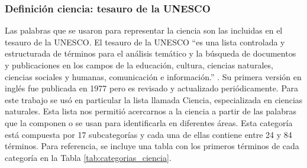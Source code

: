 \documentclass[11pt,a4paper]{article}
\begin{document}
	
	\subsubsection{Definición ciencia: tesauro de la UNESCO}
	Las palabras que se usaron para representar la ciencia son las incluidas en el tesauro de la UNESCO.
	El tesauro de la UNESCO ``es una lista controlada y estructurada de términos para el análisis temático y la búsqueda de documentos y publicaciones en los campos de la educación, cultura, ciencias naturales, ciencias sociales y humanas, comunicación e información.'' \cite{unesco_thesaurus_1977}. 
	Su primera versión en inglés fue publicada en 1977 pero es revisado y actualizado periódicamente. Para este trabajo se usó en particular la lista llamada Ciencia, especializada en ciencias naturales. Esta lista nos permitió acercarnos a la ciencia a partir de las palabras que la componen o se usan para identificarla en diferentes áreas. Esta categoría está compuesta por 17 subcategorías y cada una de ellas contiene entre 24 y 84 términos.
	Para referencia, se incluye una tabla con los primeros términos de cada categoría en la Tabla \ref{tab:categorias_ciencia}.
	
\end{document}
